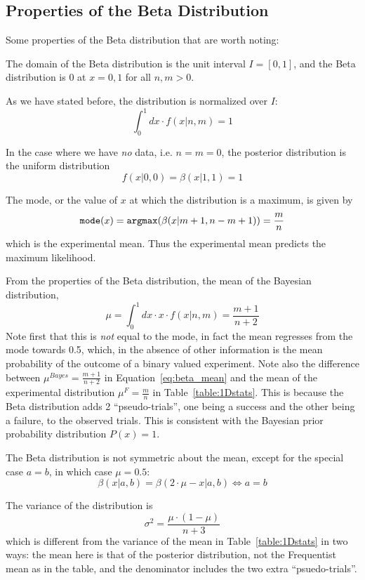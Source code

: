 \documentclass[letterpaper,12pt]{article}
\newcommand{\bdm}{\begin{displaymath}} %
\newcommand{\edm}{\end{displaymath}} %
\begin{document}
\subsection{Properties of the Beta Distribution}\label{sec:beta_props}
Some properties of the Beta distribution that are worth noting:
\bi
\item The domain of the Beta distribution is the unit interval  \(I =
  [0,1]\), and the Beta distribution is 0 at \(x=0,1\)  for all \(n,m
  >0\).
\item As we have stated before, the distribution is normalized over \(I\):
  \bdm
  \int_0^1 dx\cdot f(x|n,m) = 1
  \edm
\item In the case where we have {\em no} data, i.e. \(n=m=0\), the
  posterior distribution is the uniform distribution
  \bdm
  f(x|0,0)=\beta(x|1,1) =1
  \edm
\item The mode, or the value of \(x\) at which the distribution is a
  maximum, is given by
  \bdm
  {\tt mode}(x) = {\tt argmax}(\beta(x|m+1, n-m+1)) = \frac{m}{n}
  \edm
  which is the experimental mean. Thus the experimental mean
  predicts the maximum likelihood.
\item From the properties of the Beta distribution,
the mean of the Bayesian distribution,
\begin{equation}
\label{eq:beta_mean}
\mu = \int_0^1 dx \cdot x\cdot f(x|n,m) = \frac{m+1}{n+2}
\end{equation}
Note first that this is {\em not} equal to the mode, in fact the mean
regresses from the mode towards 0.5, which, in the absence of other
information is the mean probability of the outcome of a binary valued
experiment.  Note also the difference between
\(\mu^{Bayes}=\frac{m+1}{n+2}\) in Equation~\ref{eq:beta_mean} and the
mean of the experimental distribution \(\mu^F=\frac{m}{n}\) in
Table~\ref{table:1Dstats}. This is because the Beta distribution adds
2 ``pseudo-trials'', one being a success and the other being a
failure, to the observed trials. This is consistent with the Bayesian
prior probability distribution \(P(x) = 1\).
\item The Beta distribution is not symmetric about the mean,
  except for the special case \(a=b\), in which case \(\mu = 0.5\):
  \begin{equation}
  \label{eq:beta_symmetric}
  \beta(x|a,b) = \beta(2 \cdot \mu-x|a,b) \iff a=b
  \end{equation}
\item The variance of the distribution is 
  \begin{equation}
  \label{eq:beta_variance}
  \sigma^2 = \frac{\mu\cdot(1-\mu)}{n+3}
  \end{equation}
  which is different from the variance of the mean in
  Table~\ref{table:1Dstats} in two ways: the mean here is that of the
  posterior distribution, not the Frequentist mean as in the table,
  and the denominator includes the two extra ``psuedo-trials''.
\end{document}
